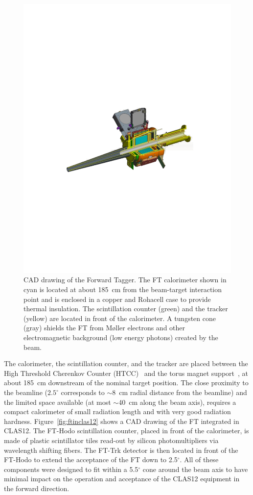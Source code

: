 \begin{figure}[th!]
\centering 
\includegraphics[width=\textwidth]{./fig/ft-model.pdf} 
\caption{CAD drawing of the Forward Tagger. The FT calorimeter shown in cyan is located at about 185~cm from the
  beam-target interaction point and is enclosed in a copper and Rohacell case to provide thermal insulation. The scintillation
  counter (green) and the tracker (yellow) are located in front of the calorimeter. A tungsten cone (gray) shields the FT
  from M{\o}ller electrons and other electromagnetic background (low energy photons) created by the beam. } 
\label{fig:ftcad} 
\end{figure}

The calorimeter, the scintillation counter, and the tracker are placed between the High Threshold Cherenkov
Counter (HTCC)~\cite{htcc} and the torus magnet support~\cite{magnets}, at about 185~cm downstream of the
nominal target position. The close proximity to the beamline ($2.5^\circ$ corresponds to $\sim$8~cm radial distance
from the beamline) and the
limited space available (at most $\sim$40~cm along the beam axis), requires a compact calorimeter of small
radiation length and with very good radiation hardness. Figure~\ref{fig:ftinclas12} shows a CAD drawing of the
FT integrated in CLAS12. The FT-Hodo scintillation counter, placed in front of the calorimeter, is made of plastic
scintillator tiles  read-out by silicon photomultipliers via wavelength shifting fibers. The FT-Trk detector is then
located in front of the FT-Hodo to extend the acceptance of the FT down to 2.5$^\circ$. All of these
components were designed to fit within a 5.5$^{\circ}$ cone around the beam axis to have minimal impact on the operation
and acceptance of the CLAS12 equipment in the forward direction.

